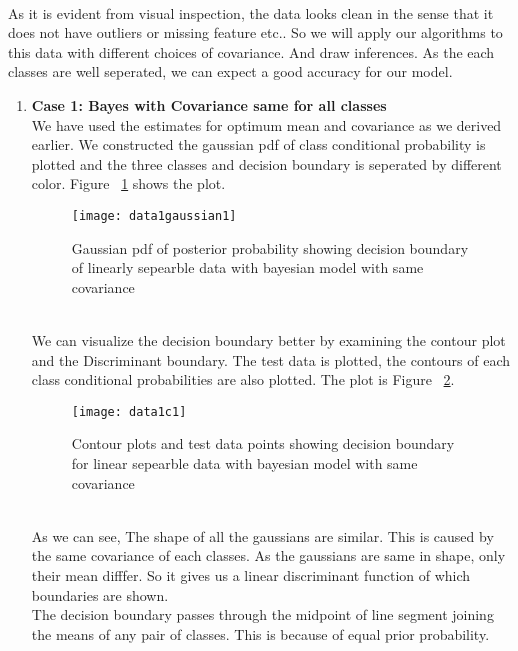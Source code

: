 \documentclass[11pt,paper=a4,answers]{exam}
\begin{document}
\begin{questions}
\begin{enumerate}[i.]
\begin{figure}[ht]
        \end{figure}\\
        As it is evident from visual inspection, the data looks clean in the sense that it does not have outliers or missing feature etc.. So we will apply our algorithms to this data with different choices of covariance. And draw inferences. As the each classes are well seperated, we can expect a good accuracy for our model.
        \begin{enumerate}
            \item \textbf{Case 1: Bayes with Covariance same for all classes}\\
            We have used the estimates for optimum mean and covariance as we derived earlier. We constructed the gaussian pdf of class conditional probability is plotted and the three classes and decision boundary is seperated by different color. Figure ~\ref{fig:data1g1} shows the plot.\\
            \begin{figure}[ht]
                \centering
                \texttt{[image: data1gaussian1]}
                \vspace{-30pt}
                \caption{Gaussian pdf of posterior probability showing decision boundary of linearly sepearble data with bayesian model with same covariance}
                \label{fig:data1g1}
            \end{figure}\\
            We can visualize the decision boundary better by examining the contour plot and the Discriminant boundary. The test data is plotted, the contours of each class conditional probabilities are also plotted. The plot is Figure ~\ref{fig:data1c1}.\\ 
            \begin{figure}[ht]
                \centering
                \texttt{[image: data1c1]}
                \vspace{-30pt}
                \caption{Contour plots and test data points showing decision boundary for linear sepearble data with bayesian model with same covariance}
                \label{fig:data1c1}
            \end{figure}\\
            As we can see, The shape of all the gaussians are similar. This is caused by the same covariance of each classes. As the gaussians are same in shape, only their mean difffer. So it gives us a linear discriminant function of which boundaries are shown.\\
            The decision boundary passes through the midpoint of line segment joining the means of any pair of classes. This is because of equal prior probability.
            

\end{enumerate}
\end{enumerate}
\end{questions}
\end{document}
